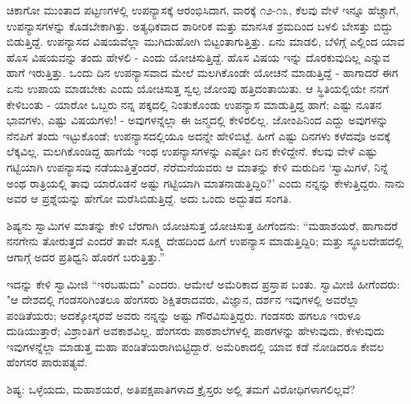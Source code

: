 ಚಿಕಾಗೋ ಮುಂತಾದ ಪಟ್ಟಣಗಳಲ್ಲಿ ಉಪನ್ಯಾಸಕ್ಕೆ ಆರಂಭಿಸಿದಾಗ, ವಾರಕ್ಕೆ ೧೨-೧೩, ಕೆಲವು ವೇಳೆ ಇನ್ನೂ ಹೆಚ್ಚಾಗೆ, ಉಪನ್ಯಾಸಗಳನ್ನು ಕೊಡಬೇಕಾಗಿತ್ತು. ಅತ್ಯಧಿಕವಾದ ಶಾರೀರಿಕ ಮತ್ತು ಮಾನಸಿಕ ಶ್ರಮದಿಂದ ಬಳಲಿ ಬೇಸತ್ತು ಬಿದ್ದು ಬಿಡುತ್ತಿದ್ದೆ. ಉಪನ್ಯಾಸದ ವಿಷಯವೆಲ್ಲಾ ಮುಗಿದುಹೋಗಿ ಬಿಟ್ಟಂತಾಗುತ್ತಿತ್ತು. ಏನು ಮಾಡಲಿ, ಬೆಳಿಗ್ಗೆ ಎಲ್ಲಿಂದ ಯಾವ ಹೊಸ ವಿಷಯವನ್ನು ತಂದು ಹೇಳಲಿ - ಎಂದು ಯೋಚಿಸುತ್ತಿದ್ದೆ. ಹೊಸ ವಿಷಯ ಇನ್ನು ದೊರಕುವುದಿಲ್ಲ ಎನ್ನುವ ಹಾಗೆ ಇರುತ್ತಿತ್ತು. ಒಂದು ದಿನ ಉಪನ್ಯಾಸವಾದ ಮೇಲೆ ಮಲಗಿಕೊಂಡೇ ಯೋಚನೆ ಮಾಡುತ್ತಿದ್ದೆ - ಹಾಗಾದರೆ ಈಗ ಏನು ಉಪಾಯ ಮಾಡಬೇಕು ಎಂದು ಯೋಚಿಸುತ್ತ ಸ್ವಲ್ಪ ಜೋಂಪು ಹತ್ತಿದಂತಾಯಿತು. ಆ ಸ್ಥಿತಿಯಲ್ಲಿಯೇ ನನಗೆ ಕೇಳಿಬಂತು - ಯಾರೋ ಒಬ್ಬರು ನನ್ನ ಪಕ್ಕದಲ್ಲಿ ನಿಂತುಕೊಂಡು ಉಪನ್ಯಾಸ ಮಾಡುತ್ತಿದ್ದ ಹಾಗೆ; ಎಷ್ಟು ನೂತನ ಭಾವಗಳು, ಎಷ್ಟು ವಿಷಯಗಳು! - ಅವುಗಳನ್ನೆಲ್ಲಾ ಈ ಜನ್ಮದಲ್ಲಿ ಕೇಳಿರಲಿಲ್ಲ. ಜೋಂಪಿನಿಂದ ಎದ್ದು ಅವುಗಳನ್ನು ನೆನಪಿಗೆ ತಂದು ಇಟ್ಟುಕೊಂಡೆ; ಉಪನ್ಯಾಸದಲ್ಲಿಯೂ ಅದನ್ನೇ ಹೇಳಿಬಿಟ್ಟೆ. ಹೀಗೆ ಎಷ್ಟು ದಿನಗಳು ಕಳೆದವೊ ಅವಕ್ಕೆ ಲೆಕ್ಕವಿಲ್ಲ. ಮಲಗಿಕೊಂಡಿದ್ದ ಹಾಗೆಯೆ ಇಂಥ ಉಪನ್ಯಾಸಗಳನ್ನು ಎಷ್ಟೋ ದಿನ ಕೇಳಿದ್ದೇನೆ. ಕೆಲವು ವೇಳೆ ಎಷ್ಟು ಗಟ್ಟಿಯಾಗಿ ಉಪನ್ಯಾಸವು ನಡೆಯುತ್ತಿತ್ತೆಂದರೆ, ನೆರೆಮನೆಯವರು ಆ ಮಾತನ್ನು ಕೇಳಿ ಮರುದಿನ ‘ಸ್ವಾಮಿಗಳೆ, ನಿನ್ನೆ ಅಂಥ ರಾತ್ರಿಯಲ್ಲಿ ತಾವು ಯಾರೊಡನೆ ಅಷ್ಟು ಗಟ್ಟಿಯಾಗಿ ಮಾತನಾಡುತ್ತಿದ್ದಿರಿ?’ ಎಂದು ನನ್ನನ್ನು ಕೇಳುತ್ತಿದ್ದರು. ನಾನು ಅವರ ಆ ಪ್ರಶ್ನೆಯನ್ನು ಹೇಗೋ ಮರೆಸಿಬಿಡುತ್ತಿದ್ದೆ. ಅದು ಒಂದು ಅದ್ಭುತದ ಸಂಗತಿ.

ಶಿಷ್ಯನು ಸ್ವಾಮಿಗಳ ಮಾತನ್ನು ಕೇಳಿ ಬೆರಗಾಗಿ ಯೋಚಿಸುತ್ತ ಯೋಚಿಸುತ್ತ ಹೀಗೆಂದನು: “ಮಹಾಶಯರೆ, ಹಾಗಾದರೆ ನನಗೇನು ತೋರುತ್ತದೆ ಎಂದರೆ ತಾವೇ ಸೂಕ್ಷ್ಮ ದೇಹದಿಂದ ಹೀಗೆ ಉಪನ್ಯಾಸ ಮಾಡುತ್ತಿದ್ದಿರಿ; ಮತ್ತು ಸ್ಥೂಲದೇಹದಲ್ಲಿ ಆಗಾಗ್ಗೆ ಅದರ ಪ್ರತಿಧ್ವನಿ ಹೊರಗೆ ಬರುತ್ತಿತ್ತು.”

ಇದನ್ನು ಕೇಳಿ ಸ್ವಾಮೀಜಿ “ಇರಬಹುದು" ಎಂದರು. ಆಮೇಲೆ ಅಮೆರಿಕಾದ ಪ್ರಸ್ತಾಪ ಬಂತು. ಸ್ವಾಮೀಜಿ ಹೀಗೆಂದರು: "ಆ ದೇಶದಲ್ಲಿ ಗಂಡಸರಿಗಿಂತಲೂ ಹೆಂಗಸರು ಶಿಕ್ಷಿತರಾದವರು, ವಿಜ್ಞಾನ, ದರ್ಶನ ಇವುಗಳಲ್ಲಿ ಅವರೆಲ್ಲಾ ಪಂಡಿತೆಯರು; ಅದಕ್ಕೋಸ್ಕರವೆ ಅವರು ನನ್ನನ್ನು ಅಷ್ಟು ಗೌರವಿಸುತ್ತಿದ್ದರು. ಗಂಡಸರು ಹಗಲೂ ಇರುಳೂ ದುಡಿಯುತ್ತಾರೆ; ವಿಶ್ರಾಂತಿಗೆ ಅವಕಾಶವಿಲ್ಲ. ಹೆಂಗಸರು ಪಾಠಶಾಲೆಗಳಲ್ಲಿ ಪಾಠಗಳನ್ನು ಹೇಳುವುದು, ಕೇಳುವುದು ಇವುಗಳನ್ನೆಲ್ಲಾ ಮಾಡುತ್ತ ಮಹಾ ಪಂಡಿತೆಯರಾಗಿಬಿಟ್ಟಿದ್ದಾರೆ. ಅಮೆರಿಕಾದಲ್ಲಿ ಯಾವ ಕಡೆ ನೋಡಿದರೂ ಕೇವಲ ಹೆಂಗಸರ ಪಾರುಪತ್ಯವೆ.

ಶಿಷ್ಯ: ಒಳ್ಳೆಯದು, ಮಹಾಶಯರೆ, ಅತಿಪಕ್ಷಪಾತಿಗಳಾದ ಕ್ರೈಸ್ತರು ಅಲ್ಲಿ ತಮಗೆ ವಿರೋಧಿಗಳಾಗಲಿಲ್ಲವೆ?

